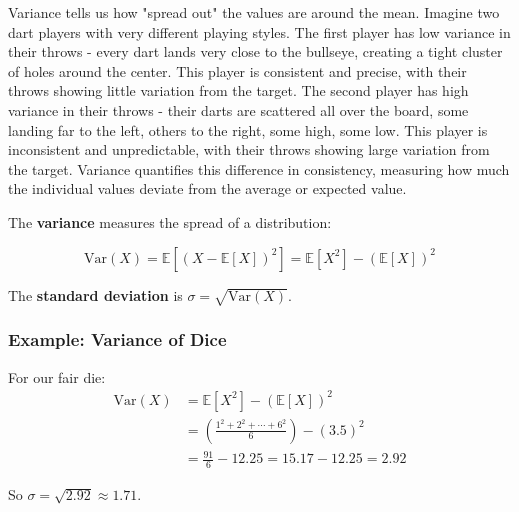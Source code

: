 Variance tells us how "spread out" the values are around the mean. Imagine two dart players with very different playing styles. The first player has low variance in their throws - every dart lands very close to the bullseye, creating a tight cluster of holes around the center. This player is consistent and precise, with their throws showing little variation from the target. The second player has high variance in their throws - their darts are scattered all over the board, some landing far to the left, others to the right, some high, some low. This player is inconsistent and unpredictable, with their throws showing large variation from the target. Variance quantifies this difference in consistency, measuring how much the individual values deviate from the average or expected value.

The \textbf{variance} measures the spread of a distribution:

\begin{equation}
\text{Var}(X) = \mathbb{E}[(X - \mathbb{E}[X])^2] = \mathbb{E}[X^2] - (\mathbb{E}[X])^2
\end{equation}

The \textbf{standard deviation} is $\sigma = \sqrt{\text{Var}(X)}$.

\subsubsection{Example: Variance of Dice}

For our fair die:
\begin{align}
\text{Var}(X) &= \mathbb{E}[X^2] - (\mathbb{E}[X])^2 \\
&= \left(\frac{1^2 + 2^2 + \cdots + 6^2}{6}\right) - (3.5)^2 \\
&= \frac{91}{6} - 12.25 = 15.17 - 12.25 = 2.92
\end{align}

So $\sigma = \sqrt{2.92} \approx 1.71$.

\begin{center}
\end{center}

